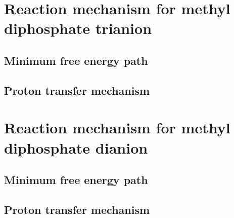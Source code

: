 \clearpage
\section{Reaction mechanism for methyl diphosphate trianion}



\subsection{Minimum free energy path}



\subsection{Proton transfer mechanism}



\clearpage
\section{Reaction mechanism for methyl diphosphate dianion}



\subsection{Minimum free energy path}



\subsection{Proton transfer mechanism}



